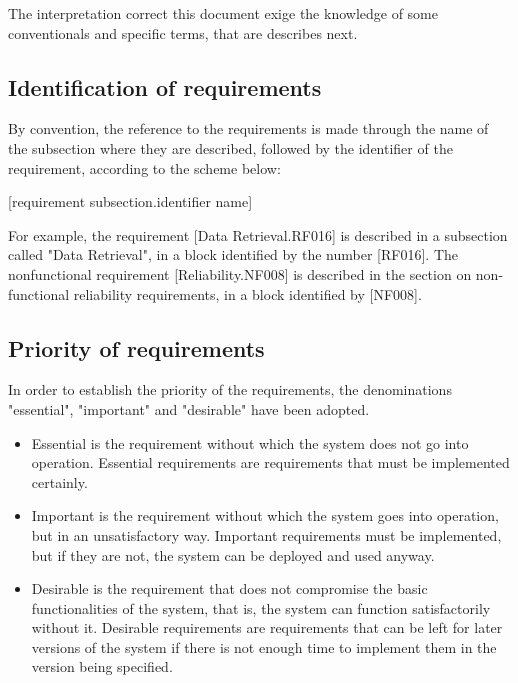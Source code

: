 \documentclass[11pt, twoside, a4paper]{book}
\begin{document}
			The interpretation correct this document exige the knowledge of some conventionals and specific terms, that are describes next.
			
			\subsection{Identification of requirements}
			
				By convention, the reference to the requirements is made through the name of the subsection where they are described, followed by the identifier of the requirement, according to the scheme below:

				\begin{center}
					[requirement subsection.identifier name]	
				\end{center}						
			

				For example, the requirement [Data Retrieval.RF016] is described in a subsection called "Data Retrieval", in a block identified by the number [RF016]. The nonfunctional requirement [Reliability.NF008] is described in the section on non-functional reliability requirements, in a block identified by [NF008].
				
			\subsection{Priority of requirements}
			
				In order to establish the priority of the requirements, the denominations "essential", "important" and "desirable" have been adopted.
				
				\begin{itemize}
					\item Essential is the requirement without which the system does not go into operation. Essential requirements are requirements that must be implemented certainly.
					\item Important is the requirement without which the system goes into operation, but in an unsatisfactory way. Important requirements must be implemented, but if they are not, the system can be deployed and used anyway.
					\item Desirable is the requirement that does not compromise the basic functionalities of the system, that is, the system can function satisfactorily without it. Desirable requirements are requirements that can be left for later versions of the system if there is not enough time to implement them in the version being specified.	
				\end{itemize}
\end{document}
